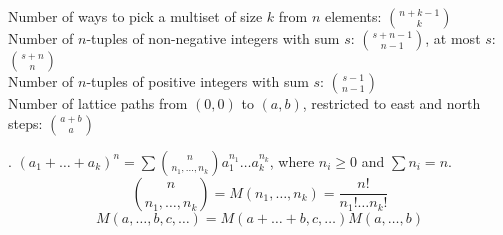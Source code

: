 \iffalse
\begin{tabular}{r|rrrrrrrrrrrrr}
    & $0$ & $1$ & $2$ & $3$ & $4$ & $5$ & $6$ & $7$ & $8$ & $9$ & $10$ & $11$ & $12$ \\
    \hline
    $0$ & $1$\\
    $1$ & $1$ & $1$\\
    $2$ & $1$ & $2$ & $1$\\
    $3$ & $1$ & $3$ & $3$ & $1$\\
    $4$ & $1$ & $4$ & $6$ & $4$ & $1$\\
    $5$ & $1$ & $5$ & $10$ & $10$ & $5$ & $1$\\
    $6$ & $1$ & $6$ & $15$ & $20$ & $15$ & $6$ & $1$\\
    $7$ & $1$ & $7$ & $21$ & $35$ & $35$ & $21$ & $7$ & $1$\\
    $8$ & $1$ & $8$ & $28$ & $56$ & $70$ & $56$ & $28$ & $8$ & $1$\\
    $9$ & $1$ & $9$ & $36$ & $84$ & $126$ & $126$ & $84$ & $36$ & $9$ & $1$\\
    $10$ & $1$ & $10$ & $45$ & $120$ & $210$ & $252$ & $210$ & $120$ & $45$ & $10$ & $1$\\
    $11$ & $1$ & $11$ & $55$ & $165$ & $330$ & $462$ & $462$ & $330$ & $165$ & $55$ & $11$ & $1$\\
    $12$ & $1$ & $12$ & $66$ & $220$ & $495$ & $792$ & $924$ & $792$ & $495$ & $220$ & $66$ & $12$ & $1$ \\
    \hline
    & $0$ & $1$ & $2$ & $3$ & $4$ & $5$ & $6$ & $7$ & $8$ & $9$ & $10$ & $11$ & $12$
\end{tabular}
\fi

Number of ways to pick a multiset of size $k$ from $n$ elements: ${n+k-1 \choose k}$ \\
Number of $n$-tuples of non-negative integers with sum $s$:
${{s+n-1} \choose {n-1}}$, at most $s$: ${{s + n} \choose {n}}$ \\
Number of $n$-tuples of positive integers with sum $s$:
${{s-1} \choose {n-1}}$ \\
Number of lattice paths from $(0,0)$ to $(a,b)$, restricted to east and north
steps: ${a+b \choose a}$

.
$(a_1+\dots+a_k)^n = \sum {n \choose n_1,\dots,n_k} a_1^{n_1} \dots a_k^{n_k}$,
where $n_i \ge 0$ and $\sum n_i=n$. \\
$${n \choose n_1,\dots,n_k} = M(n_1,\dots,n_k) = \frac{n!}{n_1! \dots n_k!}$$
$$M(a,\dots,b,c,\dots) = M(a+\dots+b,c,\dots) M(a,\dots,b)$$

